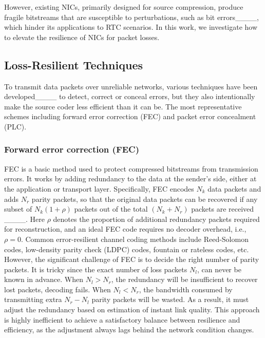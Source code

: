     However, existing NICs, primarily designed for source compression, produce fragile bitstreams that are susceptible to perturbations, such as bit errors____, which hinder its applications to RTC scenarios. 
    In this work, we investigate how to elevate the resilience of NICs for packet losses.

    \subsection{Loss-Resilient Techniques}\label{subsec:loss-resilience-techniques}
    To transmit data packets over unreliable networks, various techniques have been developed____ to detect, correct or conceal errors, but they also intentionally make the source coder less efficient than it can be.
    The most representative schemes including forward error correction (FEC) and packet error concealment (PLC).

    \subsubsection{Forward error correction (FEC)}
    FEC is a basic method used to protect compressed bitstreams from transmission errors.
    It works by adding redundancy to the data at the sender's side, either at the application or transport layer.
    Specifically, FEC encodes $N_{k}$ data packets and adds $N_{r}$ parity packets, so that the original data packets can be recovered if any subset of $N_{k} (1 + \rho)$ packets out of the total $(N_{k} + N_{r})$ packets are received ____.
    Here $\rho$ denotes the proportion of additional redundancy packets required for reconstruction, and an ideal FEC code requires no decoder overhead, i.e., $\rho = 0$.
    Common error-resilient channel coding methods include Reed-Solomon codes, low-density parity check (LDPC) codes, fountain or rateless codes, etc.
    However, the significant challenge of FEC is to decide the right number of parity packets.
    It is tricky since the exact number of loss packets $N_{l}$, can never be known in advance.
    When $N_{l} > N_{r}$, the redundancy will be insufficient to recover lost packets, decoding fails.
    When $N_{l} < N_{r}$, the bandwidth consumed by transmitting extra $N_{r} - N_{l}$ parity packets will be wasted.
    As a result, it must adjust the redundancy based on estimation of instant link quality.
    This approach is highly inefficient to achieve a satisfactory balance between resilience and efficiency, as the adjustment always lags behind the network condition changes.


